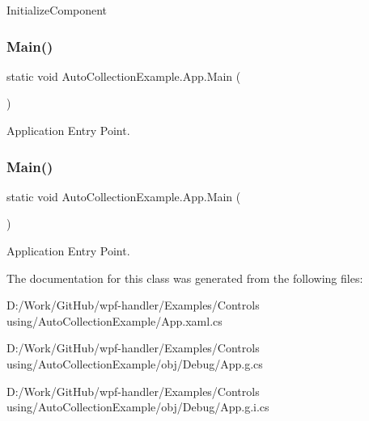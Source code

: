 Initialize\+Component 

\mbox{\label{class_auto_collection_example_1_1_app_ae565896f9eb648caf5bb2ae232382442}} 
\subsubsection{\texorpdfstring{Main()}{Main()}\hspace{0.1cm}{\footnotesize\ttfamily [1/2]}}
{\footnotesize\ttfamily static void Auto\+Collection\+Example.\+App.\+Main (\begin{DoxyParamCaption}{ }\end{DoxyParamCaption})\hspace{0.3cm}{\ttfamily [static]}}



Application Entry Point. 

\mbox{\label{class_auto_collection_example_1_1_app_ae565896f9eb648caf5bb2ae232382442}} 
\subsubsection{\texorpdfstring{Main()}{Main()}\hspace{0.1cm}{\footnotesize\ttfamily [2/2]}}
{\footnotesize\ttfamily static void Auto\+Collection\+Example.\+App.\+Main (\begin{DoxyParamCaption}{ }\end{DoxyParamCaption})\hspace{0.3cm}{\ttfamily [static]}}



Application Entry Point. 



The documentation for this class was generated from the following files\+:\begin{DoxyCompactItemize}
\item 
D\+:/\+Work/\+Git\+Hub/wpf-\/handler/\+Examples/\+Controls using/\+Auto\+Collection\+Example/App.\+xaml.\+cs\item 
D\+:/\+Work/\+Git\+Hub/wpf-\/handler/\+Examples/\+Controls using/\+Auto\+Collection\+Example/obj/\+Debug/App.\+g.\+cs\item 
D\+:/\+Work/\+Git\+Hub/wpf-\/handler/\+Examples/\+Controls using/\+Auto\+Collection\+Example/obj/\+Debug/App.\+g.\+i.\+cs\end{DoxyCompactItemize}
